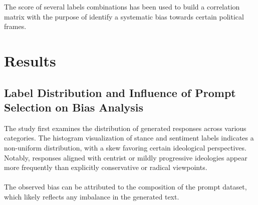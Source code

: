 \documentclass[pdflatex,sn-mathphys-num]{sn-jnl}%
\theoremstyle{thmstyleone}%
\theoremstyle{thmstyletwo}%
\theoremstyle{thmstylethree}%
\begin{document}
The score of several labels combinations has been used to build a correlation matrix with the purpose of identify a systematic bias towards certain political frames. 

\section{Results}\label{sec3}

\subsection{Label Distribution and Influence of Prompt Selection on Bias Analysis}
The study first examines the distribution of generated responses across various categories. The histogram visualization of stance and sentiment labels indicates a non-uniform distribution, with a skew favoring certain ideological perspectives. Notably, responses aligned with centrist or mildly progressive ideologies appear more frequently than explicitly conservative or radical viewpoints. 
\\\\
The observed bias can be attributed to the composition of the prompt dataset, which likely reflects any imbalance in the generated text.
\end{document}
